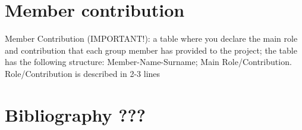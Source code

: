 \documentclass{article}
\begin{document}
\section{Member contribution}
    Member Contribution (IMPORTANT!): a table where you declare the main role and contribution
    that each group member has provided to the project; the table has the following structure:
    Member-Name-Surname; Main Role/Contribution. Role/Contribution is described in 2-3 lines
\newpage   

\section{Bibliography ???}
\newpage   
\end{document}
